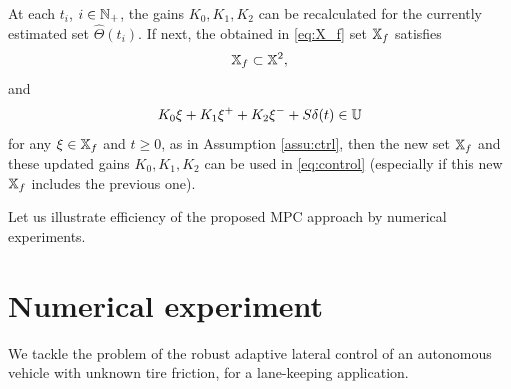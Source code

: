 \documentclass[letterpaper, 10 pt, conference]{ieeeconf}  %
\begin{document}
\begin{remark}
At each $t_{i}$, $i\in\mathbb{N}_{+}$, the gains $K_{0},K_{1},K_{2}$
can be recalculated for the currently estimated set $\hat{\Theta}(t_{i})$.
If next, the obtained in \eqref{eq:X_f} set $\mathbb{X}_{f}$ satisfies 
\[
\mathbb{X}_{f}\subset\mathbb{X}^{2},
\]
and
\[
K_{0}\xi+K_{1}\xi^{+}+K_{2}\xi^{-}+S\delta(t)\in\mathbb{U}
\]
for any $\xi\in\mathbb{X}_{f}$ and $t\geq0$, as in Assumption \ref{assu:ctrl},
then the new set $\mathbb{X}_{f}$ and these updated gains $K_{0},K_{1},K_{2}$
can be used in \eqref{eq:control} (especially if this new $\mathbb{X}_{f}$
includes the previous one).
\end{remark}
Let us illustrate efficiency of the proposed MPC approach by numerical
experiments.

\section{\label{sec:experiments} Numerical experiment}

We tackle the problem of the robust adaptive lateral control of an autonomous vehicle with unknown tire friction, for a lane-keeping application.
\end{document}
